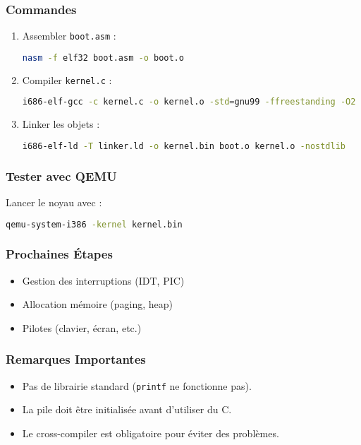 \documentclass{article}
\begin{document}
\subsubsection*{Commandes}
\begin{enumerate}
    \item Assembler \texttt{boot.asm} :
    \begin{lstlisting}[language=bash]
    nasm -f elf32 boot.asm -o boot.o
    \end{lstlisting}
    
    \item Compiler \texttt{kernel.c} :
    \begin{lstlisting}[language=bash]
    i686-elf-gcc -c kernel.c -o kernel.o -std=gnu99 -ffreestanding -O2 -Wall -Wextra
    \end{lstlisting}
    
    \item Linker les objets :
    \begin{lstlisting}[language=bash]
    i686-elf-ld -T linker.ld -o kernel.bin boot.o kernel.o -nostdlib
    \end{lstlisting}
\end{enumerate}

\subsubsection*{Tester avec QEMU}
Lancer le noyau avec :
\begin{lstlisting}[language=bash]
qemu-system-i386 -kernel kernel.bin
\end{lstlisting}

\subsubsection*{Prochaines Étapes}
\begin{itemize}
    \item Gestion des interruptions (IDT, PIC)
    \item Allocation mémoire (paging, heap)
    \item Pilotes (clavier, écran, etc.)
\end{itemize}

\subsubsection*{Remarques Importantes}
\begin{itemize}
    \item Pas de librairie standard (\texttt{printf} ne fonctionne pas).
    \item La pile doit être initialisée avant d'utiliser du C.
    \item Le cross-compiler est obligatoire pour éviter des problèmes.
\end{itemize}
\end{document}
